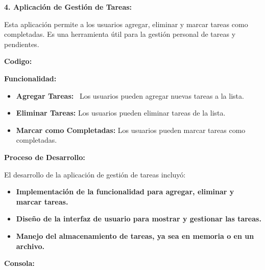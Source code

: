 \documentclass[a4paper]{article}
\begin{document}
{
\textbf{4. Aplicación de Gestión de Tareas:}}

{
Esta aplicación permite a los usuarios agregar, eliminar y marcar tareas como completadas. Es una herramienta útil para
la gestión personal de tareas y pendientes.}

{
\textbf{Codigo:}}

\begin{center}
\end{center}


\begin{center}
\end{center}

{
\textbf{Funcionalidad:}}

\begin{itemize}[resume*=listWWNumiv]
\item {
\textbf{Agregar Tareas:} \ Los usuarios pueden agregar nuevas tareas a la lista.}
\item {
\textbf{Eliminar Tareas:} Los usuarios pueden eliminar tareas de la lista.}
\item {
\textbf{Marcar como Completadas:} Los usuarios pueden marcar tareas como completadas.}
\end{itemize}
{
\textbf{Proceso de Desarrollo:}}

{
El desarrollo de la aplicación de gestión de tareas incluyó:}

\begin{itemize}[resume*=listWWNumiv]
\item {
\textbf{Implementación de la funcionalidad para agregar, eliminar y marcar tareas.}}
\item {
\textbf{Diseño de la interfaz de usuario para mostrar y gestionar las tareas.}}
\item {
\textbf{Manejo del almacenamiento de tareas, ya sea en memoria o en un archivo.}}
\end{itemize}
{
\textbf{Consola:}}
\end{document}
